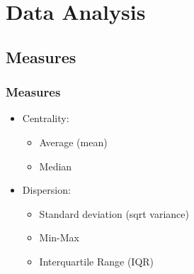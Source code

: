 



\begin{frame}
   \titlepage
\end{frame}



\begin{frame}
   \tableofcontents
\end{frame}

\section{Data Analysis}


\subsection{Measures}

\begin{frame}\frametitle{Measures}
   \begin{itemize}
      \item Centrality:
      \begin{itemize}
         \item Average (mean)
         \item Median
      \end{itemize}
      \item Dispersion:
      \begin{itemize}
         \item Standard deviation (sqrt variance)
         \item Min-Max
         \item Interquartile Range (IQR)
      \end{itemize}

   \end{itemize}
\end{frame}

